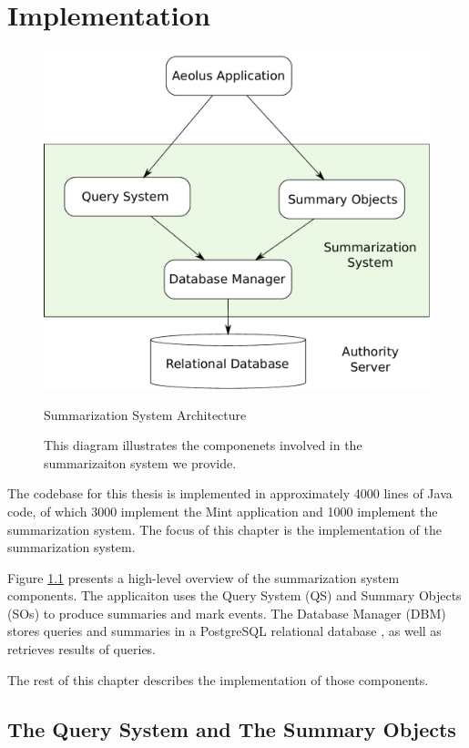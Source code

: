 \chapter{Implementation}

\begin{figure}[h]
\centering
\includegraphics[width=.8\textwidth,keepaspectratio]{figures/impl-sysarch}
\caption*{Summarization System Architecture}
\caption[Summarization System Architecture]{This diagram illustrates the componenets involved in the summarizaiton system we provide.}
\label{fig:impl-sysarch}
\end{figure}

The codebase for this thesis is implemented in approximately 4000 lines of Java code, of which 3000 implement the Mint application and 1000 implement the summarization system. The focus of this chapter is the implementation of the summarization system.

Figure \ref{fig:impl-sysarch} presents a high-level overview of the summarization system components. The applicaiton uses the Query System (QS) and Summary Objects (SOs) to produce summaries and mark events. The Database Manager (DBM) stores queries and summaries in a PostgreSQL relational database \cite{pgsql-gen}, as well as retrieves results of queries.

The rest of this chapter describes the implementation of those components.

\section{The Query System and The Summary Objects}

